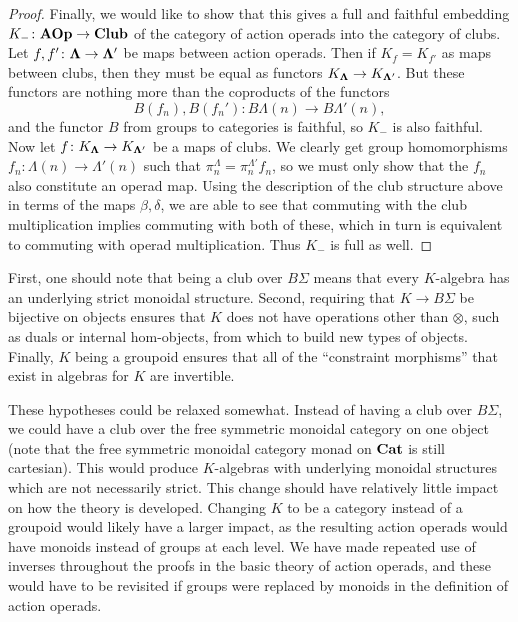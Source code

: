 \begin{proof}
Finally, we would like to show that this gives a full and faithful embedding $K_{-} \colon \mathbf{AOp} \rightarrow \mathbf{Club}$ of the category of action operads into the category of clubs. Let $f, f' \colon \mathbf{\Lambda} \rightarrow \mathbf{\Lambda'}$ be maps between action operads. Then if $K_{f} = K_{f'}$ as maps between clubs, then they must be equal as functors $K_{\mathbf{\Lambda}} \rightarrow K_{\mathbf{\Lambda'}}$. But these functors are nothing more than the coproducts of the functors
  \[
    B(f_{n}), B(f_{n}') \colon B\Lambda(n) \rightarrow B\Lambda'(n),
  \]
and the functor $B$ from groups to categories is faithful, so $K_{-}$ is also faithful. Now let $f \colon K_{\mathbf{\Lambda}} \rightarrow K_{\mathbf{\Lambda'}}$ be a maps of clubs. We clearly get group homomorphisms $f_{n} \colon \Lambda(n) \rightarrow \Lambda'(n)$ such that $\pi^{\Lambda}_{n} = \pi^{\Lambda'}_{n} f_{n}$, so we must only show that the $f_{n}$ also constitute an operad map. Using the description of the club structure above in terms of the maps $\beta, \delta$, we are able to see that commuting with the club multiplication implies commuting with both of these, which in turn is equivalent to commuting with operad multiplication. Thus $K_{-}$ is full as well.
\end{proof}

\begin{rem}
First, one should note that being a club over $B\Sigma$ means that every $K$-algebra has an underlying strict monoidal structure. Second, requiring that $K \rightarrow B\Sigma$ be bijective on objects ensures that $K$ does not have  operations other than $\otimes$, such as duals or internal hom-objects, from which to build new types of objects. Finally, $K$ being a groupoid ensures that all of the ``constraint morphisms'' that exist in algebras for $K$ are invertible.

These hypotheses could be relaxed somewhat. Instead of having a club over $B\Sigma$, we could have a club over the free symmetric monoidal category on one object (note that the free symmetric monoidal category monad on $\mathbf{Cat}$ is still cartesian). This would produce $K$-algebras with underlying monoidal structures which are not necessarily strict. This change should have relatively little impact on how the theory is developed. Changing $K$ to be a category instead of a groupoid would likely have a larger impact, as the resulting action operads would have monoids instead of groups at each level. We have made repeated use of inverses throughout the proofs in the basic theory of action operads, and these would have to be revisited if groups were replaced by monoids in the definition of action operads.
\end{rem}

